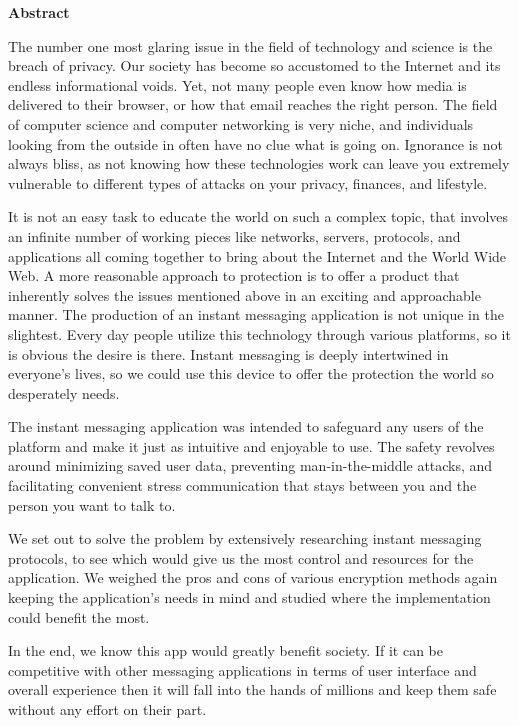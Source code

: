 \documentclass[12pt]{article}
\begin{document}
	\vspace{1cm}
		\begin{center}
\textbf{Abstract}

		\end{center}
	\vspace{1cm}
{\normalsize
The number one most glaring issue in the field of technology and science is the breach of privacy. Our society has become so accustomed to the Internet and its endless informational voids. Yet, not many people even know how media is delivered to their browser, or how that email reaches the right person. The field of computer science and computer networking is very niche, and individuals looking from the outside in often have no clue what is going on. Ignorance is not always bliss, as not knowing how these technologies work can leave you extremely vulnerable to different types of attacks on your privacy, finances, and lifestyle.


It is not an easy task to educate the world on such a complex topic, that involves an infinite number of working pieces like networks, servers, protocols, and applications all coming together to bring about the Internet and the World Wide Web. A more reasonable approach to protection is to offer a product that inherently solves the issues mentioned above in an exciting and approachable manner. The production of an instant messaging application is not unique in the slightest. Every day people utilize this technology through various platforms, so it is obvious the desire is there. Instant messaging is deeply intertwined in everyone's lives, so we could use this device to offer the protection the world so desperately needs.

The instant messaging application was intended to safeguard any users of the platform and make it just as intuitive and enjoyable to use. The safety revolves around minimizing saved user data, preventing man-in-the-middle attacks, and facilitating convenient stress communication that stays between you and the person you want to talk to.

We set out to solve the problem by extensively researching instant messaging protocols, to see which would give us the most control and resources for the application. We weighed the pros and cons of various encryption methods again keeping the application's needs in mind and studied where the implementation could benefit the most.

In the end, we know this app would greatly benefit society. If it can be competitive with other messaging applications in terms of user interface and overall experience then it will fall into the hands of millions and keep them safe without any effort on their part.

\par}
\clearpage\thispagestyle{empty}
\tableofcontents{} \label{chap:table of contents}
\clearpage\thispagestyle{empty}
\end{document}
